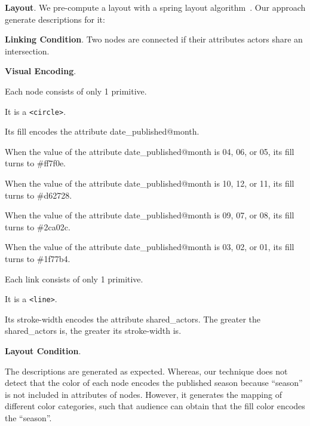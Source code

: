 \textbf{Layout}. We pre-compute a layout with a spring layout algorithm~\cite{DBLP:journals/spe/FruchtermanR91}.
Our approach generate descriptions for it:
\begin{compactitem}
    \item \textbf{Linking Condition}. Two nodes are connected if their attributes \colorbox{text-highlight}{\color{white}actors} share an intersection.
    \item \textbf{Visual Encoding}.
    \begin{compactitem}
        \item Each node consists of only 1 primitive.
        \item It is a \texttt{<circle>}. 
        \item Its fill encodes the attribute date\_published@month.
        \begin{compactitem}
            \item When the value of the attribute date\_published@month is 04, 06, or 05, its fill turns to \#ff7f0e.
            \item When the value of the attribute date\_published@month is 10, 12, or 11, its fill turns to \#d62728.
            \item When the value of the attribute date\_published@month is 09, 07, or 08, its fill turns to \#2ca02c.
            \item When the value of the attribute date\_published@month is 03, 02, or 01, its fill turns to \#1f77b4.
        \end{compactitem}
        \item Each link consists of only 1 primitive.
        \item It is a \texttt{<line>}.
        \item Its stroke-width encodes the attribute shared\_actors.
            The greater the shared\_actors is, the greater its stroke-width is.
    \end{compactitem}
    \item \textbf{Layout Condition}. 
\end{compactitem}

The descriptions are generated as expected.
Whereas, our technique does not detect that the color of each node encodes the published season because ``season'' is not included in attributes of nodes.
However, it generates the mapping of different color categories, such that audience can obtain that the fill color encodes the ``season''.

